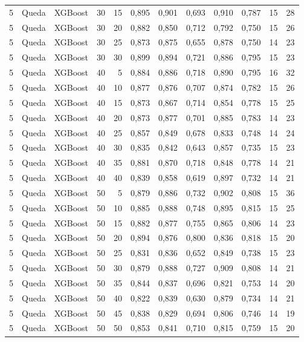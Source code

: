 \begin{longtable}{ccclrrrrrrrr}
5 & Queda & XGBoost & 30 & 15 & 0,895 & 0,901 & 0,693 & 0,910 & 0,787 & 15 & 28 \\
5 & Queda & XGBoost & 30 & 20 & 0,882 & 0,850 & 0,712 & 0,792 & 0,750 & 15 & 26 \\
5 & Queda & XGBoost & 30 & 25 & 0,873 & 0,875 & 0,655 & 0,878 & 0,750 & 14 & 23 \\
5 & Queda & XGBoost & 30 & 30 & 0,899 & 0,894 & 0,721 & 0,886 & 0,795 & 15 & 23 \\
5 & Queda & XGBoost & 40 & 5 & 0,884 & 0,886 & 0,718 & 0,890 & 0,795 & 16 & 32 \\
5 & Queda & XGBoost & 40 & 10 & 0,877 & 0,876 & 0,707 & 0,874 & 0,782 & 15 & 26 \\
5 & Queda & XGBoost & 40 & 15 & 0,873 & 0,867 & 0,714 & 0,854 & 0,778 & 15 & 25 \\
5 & Queda & XGBoost & 40 & 20 & 0,873 & 0,877 & 0,701 & 0,885 & 0,783 & 14 & 23 \\
5 & Queda & XGBoost & 40 & 25 & 0,857 & 0,849 & 0,678 & 0,833 & 0,748 & 14 & 24 \\
5 & Queda & XGBoost & 40 & 30 & 0,835 & 0,842 & 0,643 & 0,857 & 0,735 & 15 & 23 \\
5 & Queda & XGBoost & 40 & 35 & 0,881 & 0,870 & 0,718 & 0,848 & 0,778 & 14 & 21 \\
5 & Queda & XGBoost & 40 & 40 & 0,839 & 0,858 & 0,619 & 0,897 & 0,732 & 14 & 21 \\
5 & Queda & XGBoost & 50 & 5 & 0,879 & 0,886 & 0,732 & 0,902 & 0,808 & 15 & 36 \\
5 & Queda & XGBoost & 50 & 10 & 0,885 & 0,888 & 0,748 & 0,895 & 0,815 & 15 & 25 \\
5 & Queda & XGBoost & 50 & 15 & 0,882 & 0,877 & 0,755 & 0,865 & 0,806 & 14 & 23 \\
5 & Queda & XGBoost & 50 & 20 & 0,894 & 0,876 & 0,800 & 0,836 & 0,818 & 15 & 20 \\
5 & Queda & XGBoost & 50 & 25 & 0,831 & 0,836 & 0,652 & 0,849 & 0,738 & 15 & 23 \\
5 & Queda & XGBoost & 50 & 30 & 0,879 & 0,888 & 0,727 & 0,909 & 0,808 & 14 & 21 \\
5 & Queda & XGBoost & 50 & 35 & 0,844 & 0,837 & 0,696 & 0,821 & 0,753 & 14 & 20 \\
5 & Queda & XGBoost & 50 & 40 & 0,822 & 0,839 & 0,630 & 0,879 & 0,734 & 14 & 21 \\
5 & Queda & XGBoost & 50 & 45 & 0,838 & 0,829 & 0,694 & 0,806 & 0,746 & 14 & 19 \\
5 & Queda & XGBoost & 50 & 50 & 0,853 & 0,841 & 0,710 & 0,815 & 0,759 & 15 & 20 \\

\end{longtable}
